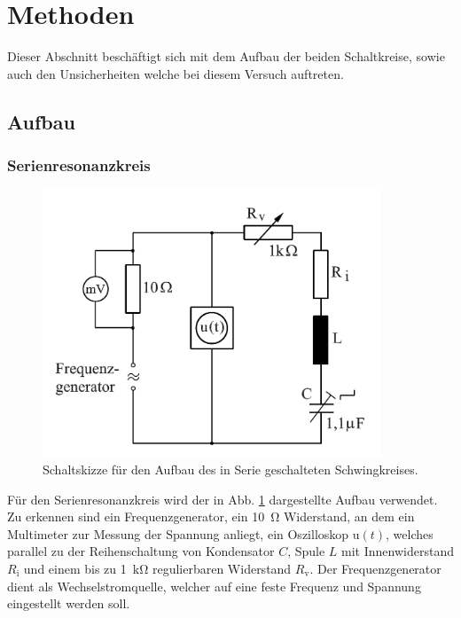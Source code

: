 \section{Methoden}
	
	Dieser Abschnitt beschäftigt sich mit dem Aufbau der beiden Schaltkreise, sowie auch den Unsicherheiten welche bei diesem Versuch auftreten.
	
	\subsection{Aufbau}
		
		
		\subsubsection{Serienresonanzkreis}
			
			\begin{figure}[ht]
				\centering
				\includegraphics[width=0.9\textwidth]{auswertung/Serienresonanz.PNG}
				\caption{Schaltskizze für den Aufbau des in Serie geschalteten Schwingkreises.}
				\label{fig:SerienResonanzSkizze}	
			\end{figure}
			
			Für den Serienresonanzkreis wird der in Abb. \ref{fig:SerienResonanzSkizze} dargestellte Aufbau verwendet.
			Zu erkennen sind ein Frequenzgenerator, ein \SI{10}{\ohm} Widerstand, an dem ein Multimeter zur Messung der Spannung anliegt, ein Oszilloskop u$(t)$, welches parallel zu der Reihenschaltung von Kondensator $C$, Spule $L$ mit Innenwiderstand $R_\text{i}$ und einem bis zu \SI{1}{\kilo\ohm} regulierbaren Widerstand $R_\text{v}$.
			Der Frequenzgenerator dient als Wechselstromquelle, welcher auf eine feste Frequenz und Spannung eingestellt werden soll.
			 
